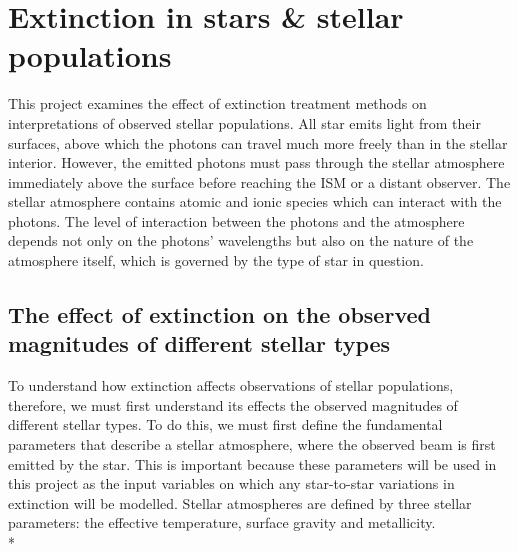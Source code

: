 \documentclass[12pt, a4paper]{report}
\begin{document}





\section{Extinction in stars \& stellar populations}
This project examines the effect of extinction treatment methods on interpretations of observed stellar populations. All star emits light from their surfaces, above which the photons can travel much more freely than in the stellar interior. However, the emitted photons must pass through the stellar atmosphere immediately above the surface before reaching the ISM or a distant observer. The stellar atmosphere contains atomic and ionic species which can interact with the photons. The level of interaction between the photons and the atmosphere depends not only on the photons' wavelengths but also on the nature of the atmosphere itself, which is governed by the type of star in question.

\subsection{The effect of extinction on the observed magnitudes of different stellar types} \label{params}

To understand how extinction affects observations of stellar populations, therefore, we must first understand its effects the observed magnitudes of different stellar types. To do this, we must first define the fundamental parameters that describe a stellar atmosphere, where the observed beam is first emitted by the star. This is important because these parameters will be used in this project as the input variables on which any star-to-star variations in extinction will be modelled. Stellar atmospheres are defined by three stellar parameters: the effective temperature, surface gravity and metallicity.\\*
\end{document}
